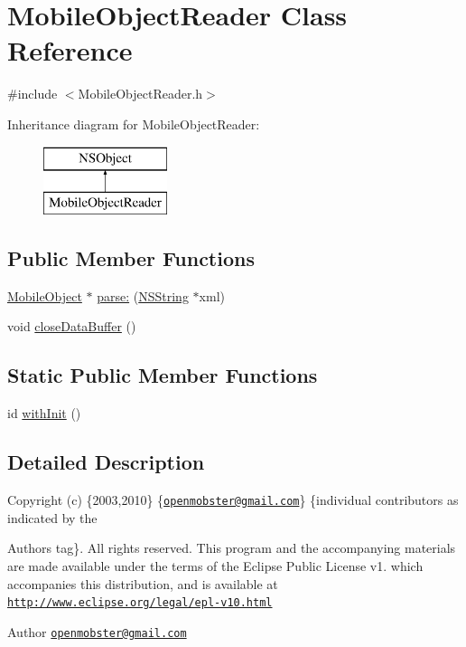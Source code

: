 \hypertarget{interface_mobile_object_reader}{
\section{\-Mobile\-Object\-Reader \-Class \-Reference}
\label{interface_mobile_object_reader}
}


{\ttfamily \#include $<$\-Mobile\-Object\-Reader.\-h$>$}

\-Inheritance diagram for \-Mobile\-Object\-Reader\-:\begin{figure}[H]
\begin{center}
\leavevmode
\includegraphics[height=2.000000cm]{interface_mobile_object_reader}
\end{center}
\end{figure}
\subsection*{\-Public \-Member \-Functions}
\begin{DoxyCompactItemize}
\item 
\hyperlink{interface_mobile_object}{\-Mobile\-Object} $\ast$ \hyperlink{interface_mobile_object_reader_ac008fbfa2104ff46af72049909d60df0}{parse\-:} (\hyperlink{class_n_s_string}{\-N\-S\-String} $\ast$xml)
\item 
void \hyperlink{interface_mobile_object_reader_ae66555cc7b452a2655201e54608f0b45}{close\-Data\-Buffer} ()
\end{DoxyCompactItemize}
\subsection*{\-Static \-Public \-Member \-Functions}
\begin{DoxyCompactItemize}
\item 
id \hyperlink{interface_mobile_object_reader_aef3a4159a0a1dd6b50273a0b43536fd1}{with\-Init} ()
\end{DoxyCompactItemize}


\subsection{\-Detailed \-Description}
\-Copyright (c) \{2003,2010\} \{\href{mailto:openmobster@gmail.com}{\tt openmobster@gmail.\-com}\} \{individual contributors as indicated by the \begin{DoxyAuthor}{\-Authors}
tag\}. \-All rights reserved. \-This program and the accompanying materials are made available under the terms of the \-Eclipse \-Public \-License v1. which accompanies this distribution, and is available at \href{http://www.eclipse.org/legal/epl-v10.html}{\tt http\-://www.\-eclipse.\-org/legal/epl-\/v10.\-html}
\end{DoxyAuthor}
\begin{DoxyAuthor}{\-Author}
\href{mailto:openmobster@gmail.com}{\tt openmobster@gmail.\-com} 
\end{DoxyAuthor}


